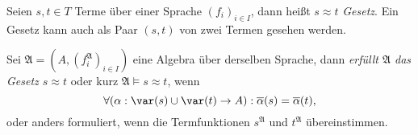 \begin{definition}
    Seien $s, t \in T$ Terme über einer Sprache $(f_i)_{i \in I}$, dann heißt $s \approx t$ \emph{Gesetz}. Ein Gesetz kann auch als Paar $(s, t)$ von zwei Termen gesehen werden.

    Sei $\mathfrak{A} = (A, (f_i^\mathfrak{A})_{i \in I})$ eine Algebra über derselben Sprache, dann \emph{erfüllt $\mathfrak{A}$ das Gesetz $s \approx t$} oder kurz \emph{$\mathfrak{A} \models s \approx t$}, wenn 
    $$ \forall (\alpha: \var(s) \cup \var(t) \to A): \overline{\alpha}(s) = \overline{\alpha}(t), $$
    oder anders formuliert, wenn die Termfunktionen $s^\mathfrak{A}$ und $t^\mathfrak{A}$ übereinstimmen.
\end{definition}